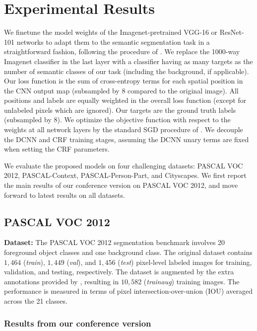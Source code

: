 \documentclass[10pt,journal,compsoc]{IEEEtran}
\begin{document}
 \section{Experimental Results}
\label{sec:experiments}

We finetune the model weights of the Imagenet-pretrained VGG-16 or ResNet-101
networks to adapt them to the semantic segmentation task in a straightforward
fashion, following the procedure of \cite{long2014fully}. We replace the
1000-way Imagenet classifier in the last layer with a classifier having as many
targets as the number of semantic classes of our task (including the background,
if applicable). Our loss function is the sum of cross-entropy terms for each
spatial position in the CNN output map (subsampled by 8 compared to the original
image). All positions and labels are equally weighted in the overall loss
function (except for unlabeled pixels which are ignored). Our targets are the
ground truth labels (subsampled by 8). We optimize the objective function with
respect to the weights at all network layers by the standard SGD procedure of
\cite{KrizhevskyNIPS2013}. We decouple the DCNN and CRF training stages,
assuming the DCNN unary terms are fixed when setting the CRF parameters.

We evaluate the proposed models on four challenging datasets: PASCAL VOC 2012,
PASCAL-Context, PASCAL-Person-Part, and Cityscapes. We first report the main
results of our conference version \cite{chen2014semantic} on PASCAL VOC 2012,
and move forward to latest results on all datasets.



\subsection{PASCAL VOC 2012}

\textbf{Dataset:} The PASCAL VOC 2012 segmentation benchmark
\cite{everingham2014pascal} involves 20 foreground object classes and one
background class. The original dataset contains $1,464$ (\textit{train}),
$1,449$ (\textit{val}), and $1,456$ (\textit{test}) pixel-level labeled
images for training, validation, and testing, respectively. The dataset is
augmented by the extra annotations provided by \cite{hariharan2011semantic},
resulting in $10,582$ (\textit{trainaug}) training images. The performance
is measured in terms of pixel intersection-over-union (IOU) averaged across
the 21 classes.

\subsubsection{Results from our conference version}
\end{document}
